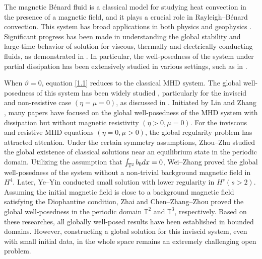 \documentclass[10pt,a4paper]{amsart}
\numberwithin{equation}{section}
\begin{document}
The magnetic B\'enard fluid is a classical model for studying heat convection in the presence of
a magnetic field, and it plays a crucial role in Rayleigh--B\'enard convection. This system has broad
applications in both physics and geophysics \cite{MR53708,MR1965452}.
Significant progress has been made in understanding the global stability and large-time behavior of
solution for viscous, thermally and electrically conducting fluids, as demonstrated 
in \cite{MR3710679, MR64593,MR1107136,MR4134456,MR4505194,MR44301,MR3887133}.
In particular, the well-posedness of the system under partial dissipation has been extensively
studied in various settings, such as in 
\cite{MR4484087, MR4046053, MR3412279, MR4500250, MR3980230, MR4505194, 
MR4790886, MR4500891, MR3977115}.

When $\vartheta=0$, equation \eqref{1.1} reduces to the classical MHD system.
The global well-posedness of this system has been widely studied \cite{MR2418123,MR346289,MR716200}, particularly for the inviscid and non-resistive case
 $(\eta=\mu=0)$, as discussed in \cite{MR920153,MR3780143,MR3738384}.
 Initiated by Lin and Zhang \cite{MR3168121}, many papers
\cite{MR3666563, MR3780143, MR3851055, MR4339533, MR4641656,MR3377532, MR3210038, MR3678491,
MR3448784}
have focused on the global well-posedness of the MHD system with dissipation but without magnetic resistivity $(\eta>0,\mu=0)$.
For the inviscous and resistive MHD equations $(\eta=0,\mu>0)$, the global regularity problem has attracted attention. Under the certain symmetry assumptions, Zhou--Zhu \cite{MR3843627} studied
the global existence of classical solutions near an equilibrium state in the periodic domain.
Utilizing the assumption that $\int_{\mathbb{T}^2}b_0{\rm d}x=0$, Wei--Zhang \cite{MR4199961}
proved the global well-posedness of the system without a non-trivial background magnetic field in
$H^4$. Later, Ye--Yin \cite{MR4496608} conducted small solution with lower regularity in $H^s (s>2)$. Assuming the initial magnetic field is close to a background magnetic field satisfying the Diophantine condition, Zhai \cite{MR4624442} and Chen--Zhang--Zhou \cite{MR4372923} proved the global well-posedness in the periodic domain $\mathbb{T}^2$ and $\mathbb{T}^3$, respectively. Based on these researches, all globally well-posed results have been established in bounded domains. However, constructing a global solution for this inviscid system, even with small initial data, in the whole space remains an extremely challenging open problem.
\end{document}
